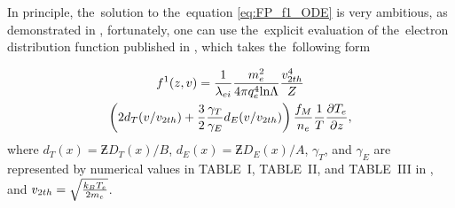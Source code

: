 In principle, the~solution to the~equation \eqref{eq:FP_f1_ODE}
is very ambitious, as demonstrated in 
\cite{Chandrasekhar_RMP1943, CSR_1950, Rosenbluth_PR1957}, fortunately, one 
can use the~explicit evaluation of the~electron distribution function
published in \cite{SpitzerHarm_PR1953}, which takes the~following form
 %
\begin{multline}
  f^1(z, v) = \frac{1}{\lambda_{ei}}\frac{m_e^2}{4 \pi q_e^4\text{ln}\Lambda} 
  \frac{v_{2 th}^4}{Z}
  \\
  \left( 2 d_T(v/v_{2 th}) 
  + \frac{3}{2}\frac{\gamma_T}{\gamma_E} d_E(v/v_{2 th}) \right) 
  \frac{f_M}{n_e}\frac{1}{T}\frac{\partial{T_e}}{\partial{z}}  ,
  \label{app_eq:f1_SH}
\end{multline}
where $d_T(x) = \Zbar D_{T}(x) / B$, $d_E(x) = \Zbar D_{E}(x) / A$, $\gamma_T$,
and $\gamma_E$ are represented by numerical values in TABLE~I, TABLE~II, and
TABLE~III in \cite{SpitzerHarm_PR1953}, and 
$v_{2 th} = \sqrt{\frac{k_B T_e}{2m_e}}$.


